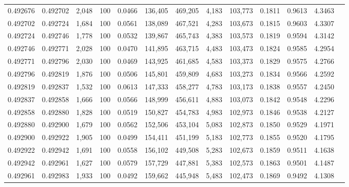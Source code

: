 \begin{tabular}{rrrrrrrrrrrrr}
0.492676 & 0.492702 & 2,048 & 100 &                                     0.0466 & 136,405 & 469,205 &   4,183 & 103,773 & 0.1811 & 0.9613 & 4.3463 \\
0.492702 & 0.492724 & 1,684 & 100 &                                     0.0561 & 138,089 & 467,521 &   4,283 & 103,673 & 0.1815 & 0.9603 & 4.3307 \\
0.492724 & 0.492746 & 1,778 & 100 &                                     0.0532 & 139,867 & 465,743 &   4,383 & 103,573 & 0.1819 & 0.9594 & 4.3142 \\
0.492746 & 0.492771 & 2,028 & 100 &                                     0.0470 & 141,895 & 463,715 &   4,483 & 103,473 & 0.1824 & 0.9585 & 4.2954 \\
0.492771 & 0.492796 & 2,030 & 100 &                                     0.0469 & 143,925 & 461,685 &   4,583 & 103,373 & 0.1829 & 0.9575 & 4.2766 \\
0.492796 & 0.492819 & 1,876 & 100 &                                     0.0506 & 145,801 & 459,809 &   4,683 & 103,273 & 0.1834 & 0.9566 & 4.2592 \\
0.492819 & 0.492837 & 1,532 & 100 &                                     0.0613 & 147,333 & 458,277 &   4,783 & 103,173 & 0.1838 & 0.9557 & 4.2450 \\
0.492837 & 0.492858 & 1,666 & 100 &                                     0.0566 & 148,999 & 456,611 &   4,883 & 103,073 & 0.1842 & 0.9548 & 4.2296 \\
0.492858 & 0.492880 & 1,828 & 100 &                                     0.0519 & 150,827 & 454,783 &   4,983 & 102,973 & 0.1846 & 0.9538 & 4.2127 \\
0.492880 & 0.492900 & 1,679 & 100 &                                     0.0562 & 152,506 & 453,104 &   5,083 & 102,873 & 0.1850 & 0.9529 & 4.1971 \\
0.492900 & 0.492922 & 1,905 & 100 &                                     0.0499 & 154,411 & 451,199 &   5,183 & 102,773 & 0.1855 & 0.9520 & 4.1795 \\
0.492922 & 0.492942 & 1,691 & 100 &                                     0.0558 & 156,102 & 449,508 &   5,283 & 102,673 & 0.1859 & 0.9511 & 4.1638 \\
0.492942 & 0.492961 & 1,627 & 100 &                                     0.0579 & 157,729 & 447,881 &   5,383 & 102,573 & 0.1863 & 0.9501 & 4.1487 \\
0.492961 & 0.492983 & 1,933 & 100 &                                     0.0492 & 159,662 & 445,948 &   5,483 & 102,473 & 0.1869 & 0.9492 & 4.1308 \\

\end{tabular}
